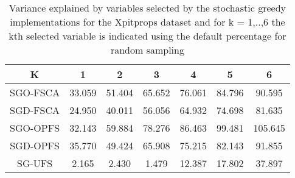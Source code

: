 \begin{table}
	\begin{center}
		\begin{tabular}{c c c c c c c}
			K & 1 & 2 & 3 & 4 & 5 & 6 \\
			\hline
			SGO-FSCA & 33.059 & 51.404 & 65.652 & 76.061 & 84.796 & 90.595 \\
			SGD-FSCA & 24.950 & 40.011 & 56.056 & 64.932 & 74.698 & 81.635 \\
			SGO-OPFS & 32.143 & 59.884 & 78.276 & 86.463 & 99.481 & 105.645 \\
			SGD-OPFS & 35.770 & 49.424 & 65.908 & 75.215 & 82.143 & 91.855 \\
			SG-UFS & 2.165 & 2.430 & 1.479 & 12.387 & 17.802 & 37.897 \\
		\end{tabular}
	\end{center}
	\caption{Variance explained by variables selected by the stochastic greedy implementations for the Xpitprops dataset and for k = 1,..,6 the kth selected variable is indicated using the default percentage for random sampling}
\end{table}